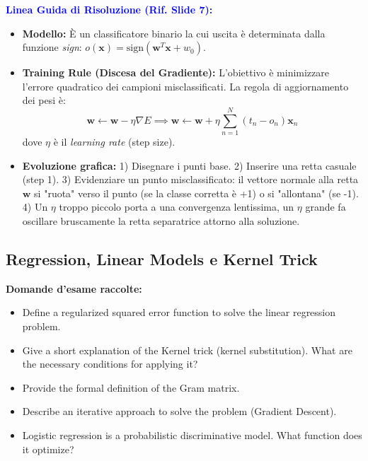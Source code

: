 \documentclass[11pt,a4paper]{article}
\begin{document}
\textbf{\textcolor{blue}{Linea Guida di Risoluzione (Rif. Slide 7):}}
\begin{itemize}
    \item \textbf{Modello:} È un classificatore binario la cui uscita è determinata dalla funzione \textit{sign}: $o(\mathbf{x}) = \text{sign}(\mathbf{w}^T\mathbf{x} + w_0)$.
    \item \textbf{Training Rule (Discesa del Gradiente):} L'obiettivo è minimizzare l'errore quadratico dei campioni misclassificati. La regola di aggiornamento dei pesi è:
    $$ \mathbf{w} \leftarrow \mathbf{w} - \eta \nabla E \implies \mathbf{w} \leftarrow \mathbf{w} + \eta \sum_{n=1}^N (t_n - o_n)\mathbf{x}_n $$
    dove $\eta$ è il \textit{learning rate} (step size).
    \item \textbf{Evoluzione grafica:}
    1) Disegnare i punti base. 2) Inserire una retta casuale (step 1). 3) Evidenziare un punto misclassificato: il vettore normale alla retta $\mathbf{w}$ si "ruota" verso il punto (se la classe corretta è +1) o si "allontana" (se -1). 4) Un $\eta$ troppo piccolo porta a una convergenza lentissima, un $\eta$ grande fa oscillare bruscamente la retta separatrice attorno alla soluzione.
\end{itemize}

\subsection{Regression, Linear Models e Kernel Trick}
\textbf{Domande d'esame raccolte:}
\begin{itemize}
    \item Define a regularized squared error function to solve the linear regression problem.
    \item Give a short explanation of the Kernel trick (kernel substitution). What are the necessary conditions for applying it?
    \item Provide the formal definition of the Gram matrix.
    \item Describe an iterative approach to solve the problem (Gradient Descent).
    \item Logistic regression is a probabilistic discriminative model. What function does it optimize?
\end{itemize}
\end{document}
